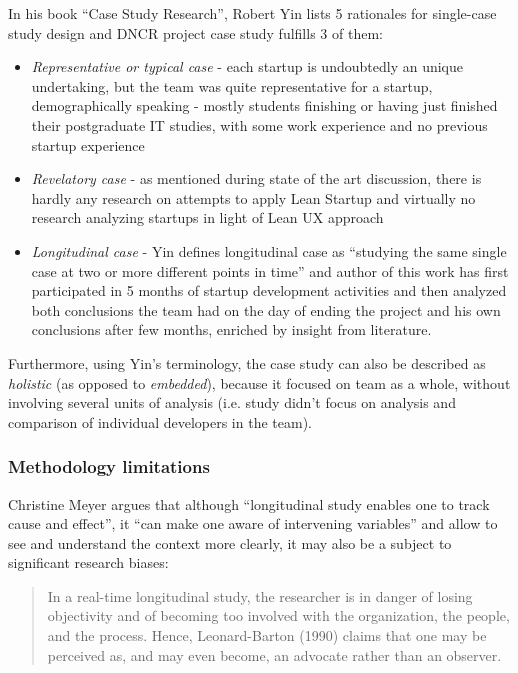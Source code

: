\documentclass{article}
\begin{document}
In his book ``Case Study Research''\cite{yin2013case}, Robert Yin lists 5 rationales for single-case study design and DNCR project case study fulfills 3 of them:
\begin{itemize}
\item \textit{Representative or typical case} - each startup is undoubtedly an unique undertaking, but the team was quite representative for a startup, demographically speaking - mostly students finishing or having just finished their postgraduate IT studies, with some work experience and no previous startup experience
\item \textit{Revelatory case} - as mentioned during state of the art discussion, there is hardly any research on attempts to apply Lean Startup and virtually no research analyzing startups in light of Lean UX approach
\item \textit{Longitudinal case} - Yin defines longitudinal case as ``studying the same single case at two or more different points in time'' and author of this work has first participated in 5 months of startup development activities and then analyzed both conclusions the team had on the day of ending the project and his own conclusions after few months, enriched by insight from literature.
\end{itemize}

Furthermore, using Yin's terminology, the case study can also be described as \textit{holistic} (as opposed to \textit{embedded}), because it focused on team as a whole, without involving several units of analysis (i.e. study didn't focus on analysis and comparison of individual developers in the team).

\subsubsection{Methodology limitations}
Christine Meyer \cite{meyer2001case} argues that although ``longitudinal study enables one to track cause and effect'', it ``can make one aware of intervening variables'' and allow to see and understand the context more clearly, it may also be a subject to significant research biases:
\begin{quote}
In a real-time longitudinal study, the researcher is in danger of losing objectivity and of becoming too involved with the organization, the people, and the process. Hence, Leonard-Barton (1990) claims that one may be perceived as, and may even become, an advocate rather than an observer.
\end{quote}
\end{document}
